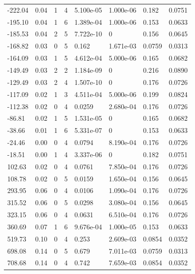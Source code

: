 \documentclass[preview]{standalone}
\begin{document}
{{\begin{tabular}{L{1.2cm}C{1.2cm} C{0.3cm}C{0.5cm} C{1.4cm}C{1.4cm} C{1.4cm}C{1.4cm}}
  -222.04  &  0.04  & 1     &  4 &  5.100e-05  & 1.000e-06  & 0.182 &  0.0751   \\ 
  -195.10  &  0.04  & 1     &  6 &  1.389e-04  & 1.000e-06  & 0.153 &  0.0633   \\ 
  -185.53  &  0.04  & 2     &  5 &  7.722e-10  & 0  & 0.156 &  0.0645   \\ 
  -168.82  &  0.03  & 0     &  5 &  0.162  & 1.671e-03  & 0.0759 &  0.0313   \\ 
  -164.09  &  0.03  & 1     &  5 &  4.612e-04  & 5.000e-06  & 0.165 &  0.0682   \\ 
  -149.49  &  0.03  & 2     &  2 &  1.184e-09  & 0  & 0.216 &  0.0890   \\ 
  -129.49  &  0.03  & 2     &  4 &  1.507e-10  & 0  & 0.176 &  0.0726   \\ 
  -117.09  &  0.02  & 1     &  3 &  4.511e-04  & 5.000e-06  & 0.199 &  0.0824   \\ 
  -112.38  &  0.02  & 0     &  4 &  0.0259  & 2.680e-04  & 0.176 &  0.0726   \\ 
  -86.81  &  0.02  & 1     &  5 &  1.531e-05  & 0  & 0.165 &  0.0682   \\ 
  -38.66  &  0.01  & 1     &  6 &  5.331e-07  & 0  & 0.153 &  0.0633   \\ 
  -24.46  &  0.00  & 0     &  4 &  0.0794  & 8.190e-04  & 0.176 &  0.0726   \\ 
  -18.51  &  0.00  & 1     &  4 &  3.337e-06  & 0  & 0.182 &  0.0751   \\ 
  102.63  &  0.02  & 0     &  4 &  0.0761  & 7.850e-04  & 0.176 &  0.0726   \\ 
  108.78  &  0.02  & 0     &  5 &  0.0159  & 1.650e-04  & 0.156 &  0.0645   \\ 
  293.95  &  0.06  & 0     &  4 &  0.0106  & 1.090e-04  & 0.176 &  0.0726   \\ 
  315.52  &  0.06  & 0     &  5 &  0.0298  & 3.080e-04  & 0.156 &  0.0645   \\ 
  323.15  &  0.06  & 0     &  4 &  0.0631  & 6.510e-04  & 0.176 &  0.0726   \\ 
  360.69  &  0.07  & 1     &  6 &  9.676e-04  & 1.000e-05  & 0.153 &  0.0633   \\ 
  519.73  &  0.10  & 0     &  4 &  0.253  & 2.609e-03  & 0.0854 &  0.0352   \\ 
  698.08  &  0.14  & 0     &  5 &  0.679  & 7.011e-03  & 0.0759 &  0.0313   \\ 
  708.68  &  0.14  & 0     &  4 &  0.742  & 7.659e-03  & 0.0854 &  0.0352   \\ 

\end{tabular}}}
\end{document}

